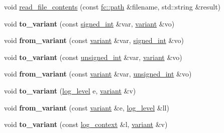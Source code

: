 \begin{DoxyCompactItemize}
\item 
void \mbox{\hyperlink{namespacefc_a23ea7ee1b75c710ca0ba138e94395ed1}{read\+\_\+file\+\_\+contents}} (const \mbox{\hyperlink{classfc_1_1path}{fc\+::path}} \&filename, std\+::string \&result)
\item 
\mbox{\label{namespacefc_aec2092daf9694789ff5cf8ab45d6e456}} 
void {\bfseries to\+\_\+variant} (const \mbox{\hyperlink{structfc_1_1signed__int}{signed\+\_\+int}} \&var, \mbox{\hyperlink{classfc_1_1variant}{variant}} \&vo)
\item 
\mbox{\label{namespacefc_aa2d8b09f66dffd1d21e17a8ab3c23a8b}} 
void {\bfseries from\+\_\+variant} (const \mbox{\hyperlink{classfc_1_1variant}{variant}} \&var, \mbox{\hyperlink{structfc_1_1signed__int}{signed\+\_\+int}} \&vo)
\item 
\mbox{\label{namespacefc_ac888b5890131278da23a6525b993c85b}} 
void {\bfseries to\+\_\+variant} (const \mbox{\hyperlink{structfc_1_1unsigned__int}{unsigned\+\_\+int}} \&var, \mbox{\hyperlink{classfc_1_1variant}{variant}} \&vo)
\item 
\mbox{\label{namespacefc_a244a3398e2002f2f7bf256cccc9acde4}} 
void {\bfseries from\+\_\+variant} (const \mbox{\hyperlink{classfc_1_1variant}{variant}} \&var, \mbox{\hyperlink{structfc_1_1unsigned__int}{unsigned\+\_\+int}} \&vo)
\item 
\mbox{\label{namespacefc_aee0810f1b1db08ece638309bbb69c83f}} 
void {\bfseries to\+\_\+variant} (\mbox{\hyperlink{classfc_1_1log__level}{log\+\_\+level}} e, \mbox{\hyperlink{classfc_1_1variant}{variant}} \&v)
\item 
\mbox{\label{namespacefc_a097ff38ff4be4e50bd7f201fa95420ff}} 
void {\bfseries from\+\_\+variant} (const \mbox{\hyperlink{classfc_1_1variant}{variant}} \&e, \mbox{\hyperlink{classfc_1_1log__level}{log\+\_\+level}} \&ll)
\item 
\mbox{\label{namespacefc_a1872b514f4232a25742f1de9ee3fbbd1}} 
void {\bfseries to\+\_\+variant} (const \mbox{\hyperlink{classfc_1_1log__context}{log\+\_\+context}} \&l, \mbox{\hyperlink{classfc_1_1variant}{variant}} \&v)
\item 
\mbox{\label{namespacefc_a78e632d9c5e00255b798eca04cd5cce8}} 

\end{DoxyCompactItemize}
